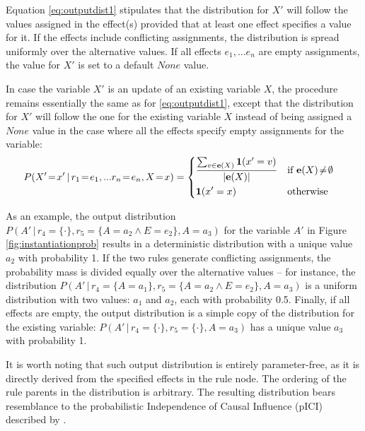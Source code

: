Equation \eqref{eq:outputdist1} stipulates that the distribution for $X'$ will follow the values assigned in the effect(s) provided that at least one effect specifies a value for it. If the effects include conflicting assignments, the distribution is spread uniformly over the alternative values. If all effects $e_1,...e_n$ are empty assignments, the value for $X'$ is set to a default $None$ value.

In case the variable $X'$ is an update of an existing variable $X$, the procedure remains essentially the same as for \eqref{eq:outputdist1}, except that the distribution for $X'$ will follow the one for the existing variable $X$ instead of being assigned a $\mathit{None}$ value in the case where all the effects specify empty assignments for the variable: 
\begin{align}
&P(X'\!=\!x' \, | \, r_1\!=\!e_1,... r_n\!=\!e_n, X\!=\!x) = \begin{dcases} 
\frac{\sum_{v \in {\mathbf{e}(X)}} \mathbf{1}(x' = v)} { |\mathbf{e}(X)| }  & \text{if } \mathbf{e}(X)\!\neq\!\emptyset \\
\mathbf{1}(x' = x) & \text{otherwise}
\end{dcases}\label{eq:outputdist2}
\end{align}

As an example, the output distribution $P(A' \, | \, r_4\!=\!\{\cdot\},r_5\!=\!\{A\!=\!a_2 \land E\!=\!e_2\}, A\!=\!a_3)$ for the variable $A'$ in Figure \ref{fig:instantiationprob} results in a deterministic distribution with a unique value $a_2$ with probability 1.  If the two rules generate conflicting assignments, the probability mass is divided equally over the alternative values -- for instance, the distribution $P(A' \, | \, r_4\!=\!\{A\!=\!a_1\},r_5\!=\!\{A\!=\!a_2 \land E\!=\!e_2\}, A\!=\!a_3)$ is a uniform distribution with two values: $a_1$ and $a_2$, each with probability 0.5. Finally, if all effects are empty, the output distribution is a simple copy of the distribution for the existing variable: $P(A' \, | \, r_4\!=\!\{\cdot\},r_5\!=\!\{\cdot\}, A\!=\!a_3)$ has a unique value $a_3$ with probability 1. 

It is worth noting that such output distribution is entirely parameter-free, as it is directly derived from the specified effects in the rule node.  The ordering of the rule parents in the distribution is arbitrary. The resulting distribution bears resemblance to the probabilistic Independence of Causal Influence (pICI) described by \cite{diez06}. 


